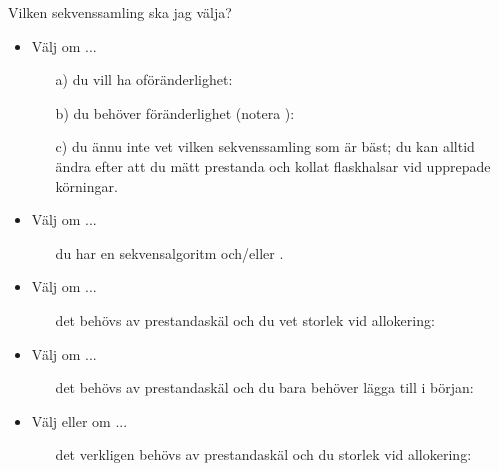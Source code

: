 \begin{Slide}{Vilken sekvenssamling ska jag välja?}\SlideFontSmall
\vspace{-0.5em}
\begin{itemize}
\item Välj  om ...
  \begin{itemize}\SlideFontTiny
  \item[a)] du vill ha oföränderlighet: 
  \item[b)] du behöver föränderlighet (notera ):\\ 
  \item[c)] du ännu inte vet vilken sekvenssamling som är bäst; du kan alltid ändra efter att du mätt prestanda och kollat flaskhalsar vid upprepade körningar.
  \end{itemize}

\item Välj  om ...
  \begin{itemize}\SlideFontTiny
  \item[] du har en  sekvensalgoritm och/eller .
  \end{itemize}

\item Välj  om ...
  \begin{itemize}\SlideFontTiny
  \item[] det behövs av prestandaskäl och du  vet storlek vid allokering:\\
  \end{itemize}

\item Välj  om ...
  \begin{itemize}\SlideFontTiny
  \item[] det behövs av prestandaskäl och du bara behöver lägga till i början:\\ 
  \end{itemize}

\item Välj  eller  om ...
  \begin{itemize}\SlideFontTiny
  \item[] det verkligen behövs av prestandaskäl och du  storlek vid allokering:\\
  \end{itemize}

\end{itemize}
\end{Slide}

